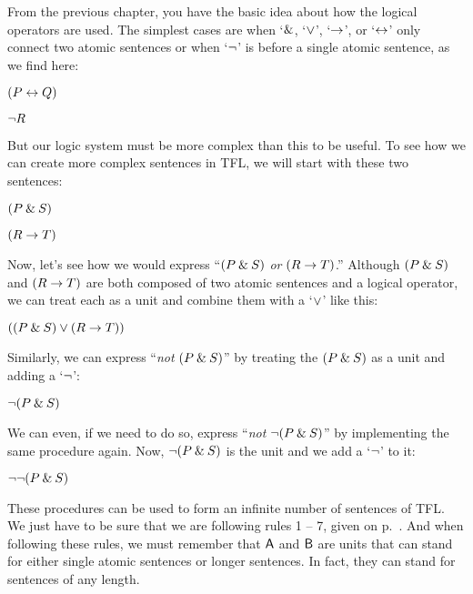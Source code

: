 From the previous chapter, you have the basic idea about how the logical operators are used. The simplest cases are when `$\mathbin{\&}$, `$\vee$', `$\rightarrow$', or `$\leftrightarrow$' only connect two atomic sentences or when `${\neg}$' is before a single atomic sentence, as we find here:  
\begin{earg}
\item[] $(P \leftrightarrow Q)$
\item[] ${\neg} R$
\end{earg}
But our logic system must be more complex than this to be useful. To see how we can create more complex sentences in TFL, we will start with these two sentences:
\begin{earg}
\item[] $(P \mathbin{\&} S)$
\item[] $(R \rightarrow T)$
\end{earg}
Now, let’s see how we would express ``$(P \mathbin{\&} S)$ \textit{or} $(R \rightarrow T)$.'' Although 
$(P \mathbin{\&} S)$ and
$(R \rightarrow T)$
are both composed of two atomic sentences and a logical operator, we can treat each as a unit and combine them with a `$\vee$’ like this:
\begin{earg}
\item[]$((P \mathbin{\&} S) \vee (R \rightarrow T))$
\end{earg}
\noindent Similarly, we can express ``\textit{not} $(P \mathbin{\&} S)$'' by treating the $(P \mathbin{\&} S)$ as a unit and adding a `${\neg}$’:
\begin{earg}
\item[] ${\neg}(P \mathbin{\&} S)$
\end{earg}
We can even, if we need to do so, express ``\textit{not} ${\neg}(P \mathbin{\&} S)$'' by implementing the same procedure again. Now, ${\neg}(P \mathbin{\&} S)$ is the unit and we add a `${\neg}$’ to it:
\begin{earg}
\item[] ${\neg}{\neg}(P \mathbin{\&} S)$
\end{earg}

These procedures can be used to form an infinite number of sentences of TFL. We just have to be sure that we are following rules 1 -- 7, given on p.~\pageref{TFLsentences}.  And when following these rules, we must remember that $\mathsf{A}$ and $\mathsf{B}$ are units that can stand for either single atomic sentences or longer sentences. In fact, they can stand for sentences of any length.

